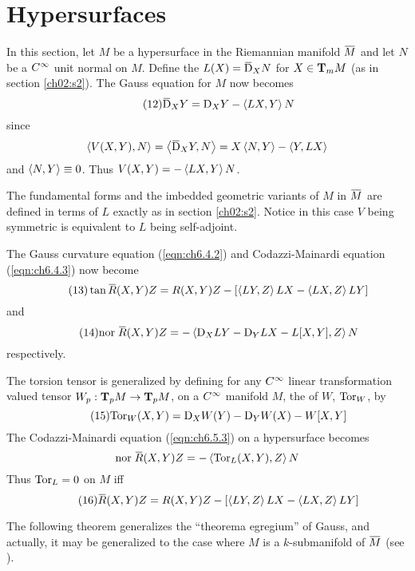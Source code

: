 \documentclass[../main]{subfiles}
\begin{document}
\section{Hypersurfaces}\label{ch06:s5}

In this section, let $M$ be a hypersurface in the Riemannian manifold $\xoverline M$ and let $N$ be a $\CInfty$ unit normal on $M$. Define the  $L(X) = \covariant_XN$
for $X\in\ts Mm$ (as in section \ref{ch02:s2}). The Gauss equation for $M$ now becomes
\begin{equation}\tag{12} \label{eqn:ch6.5.1}
    \covariant_XY=\D_XY-\ip{LX}{Y}N
\end{equation}
since
\[\ip{V(X,Y)}{N} = \ip{\covariant_XY}{N} = X\ip{N}{Y}-\ip{Y}{LX}\]
and $\ip{N}{Y}\equiv0$. Thus $V(X,Y)=-\ip{LX}{Y}N$.

The fundamental forms and the imbedded geometric variants of $M$ in $\xoverline M$ are defined in terms of $L$ exactly as in section \ref{ch02:s2}. Notice in this case $V$ being symmetric is equivalent to $L$ being self-adjoint.

The Gauss curvature equation (\ref{eqn:ch6.4.2}) and Codazzi-Mainardi equation (\ref{eqn:ch6.4.3}) now become
\begin{equation}\tag{13}\label{eqn:ch6.5.2}
    \tan\xoverline R(X,Y)Z = R(X,Y)Z - \sbr{\ip{LY}{Z}LX-\ip{LX}{Z}LY}
\end{equation}
and
\begin{equation}\tag{14} \label{eqn:ch6.5.3}
    \nor\xoverline R(X,Y)Z = -\ip{\D_XLY-\D_YLX-L[X,Y]}{Z}N
\end{equation}
respectively.

The torsion tensor is generalized by defining for any $\CInfty$ linear transformation valued tensor $W_p:\ts Mp\functionMaps\ts Mp$, on a $\CInfty$ manifold $M$, the  of $W$, $\Tor_W$, by
\begin{equation}\tag{15}\label{eqn:6.5.4}
    \Tor_W(X,Y) = \D_XW(Y) - \D_YW(X) - W[X,Y]
\end{equation}
The Codazzi-Mainardi equation (\ref{eqn:ch6.5.3}) on a hypersurface becomes
\[\nor\xoverline R(X,Y)Z = -\ip{\Tor_L(X,Y)}{Z}N\]
Thus $\Tor_L=0$ on $M$ iff
\begin{equation}\tag{16} \label{eqn:ch6.5.5}
    \xoverline R(X,Y)Z = R(X,Y)Z - \sbr{\ip{LY}{Z}LX-\ip{LX}{Z}LY}
\end{equation}

The following theorem generalizes the ``theorema egregium'' of Gauss, and actually, it may be generalized to the case where $M$ is a $k$-submanifold of $\xoverline M$ (see \cite{hicks1963submanifolds}). 
\end{document}
